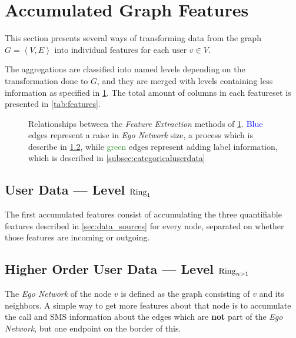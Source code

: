 \section{Accumulated Graph Features}
\label{sec:accumulatedfeatures}

This section presents several ways of transforming data from the graph $G = \left< V, E \right>$ into individual features for each user $v \in V$.

The aggregations are classified into named levels depending on the transformation done to $G$, and they are merged with levels containing less information as specified in \cref{fig:mlrelationships}. The total amount of columns in each featureset is presented in \cref{tab:features}.

\begin{figure}
\centering
\resizebox{!}{.2\textheight}{%
	\framebox{%
		
	}
}
\caption{Relationships between the \emph{Feature Extraction} methods of \cref{sec:accumulatedfeatures}. \textcolor{Blue}{Blue} edges represent a raise in \emph{Ego Network} size, a process which is describe in \cref{subsec:higherorderuserdata}, while \textcolor{ForestGreen}{green} edges represent adding label information, which is described in \cref{subsec:categoricaluserdata}}
\label{fig:mlrelationships}
\end{figure}

\subsection{User Data --- Level $\operatorname{Ring}_1$}
\label{subsec:user_data}

The first accumulated features consist of accumulating the three quantifiable features described in \cref{sec:data_sources} for every node, separated on whether those features are incoming or outgoing.

\subsection{Higher Order User Data --- Level $\operatorname{Ring}_{n > 1}$}

\label{subsec:higherorderuserdata}

The \emph{Ego Network} of the node $v$ is defined as the graph consisting of $v$ and its neighbors. A simple way to get more features about that node is to accumulate the call and SMS information about the edges which are \textbf{not} part of the \emph{Ego Network}, but one endpoint on the border of this.

